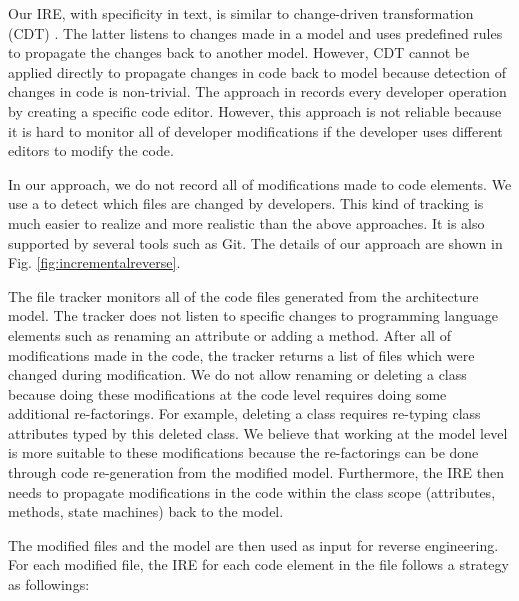 
\noindent
{}
Our IRE, with specificity in text, is similar to change-driven transformation (CDT) \cite{rath2009change}.
The latter listens to changes made in a model and uses predefined rules to propagate the changes back to another model.
However, CDT cannot be applied directly to propagate changes in code back to model because detection of changes in code is non-trivial.
The approach in \cite{kramer2015change} records every developer operation by creating a specific code editor.
However, this approach is not reliable because it is hard to monitor all of developer modifications if the developer uses different editors to modify the code.

In our approach, we do not record all of modifications made to code elements.
We use a  to detect which files are changed by developers.
This kind of tracking is much easier to realize and more realistic than the above approaches. 
It is also supported by several tools such as Git.
The details of our approach are shown in Fig. \ref{fig:incrementalreverse}.

The file tracker monitors all of the code files generated from the architecture model.
The tracker does not listen to specific changes to programming language elements such as renaming an attribute or adding a method.
After all of modifications made in the code, the tracker returns a list of files which were changed during modification.
We do not allow renaming or deleting a class because doing these modifications at the code level requires doing some additional re-factorings.
For example, deleting a class requires re-typing class attributes typed by this deleted class.  
We believe that working at the model level is more suitable to these modifications because the re-factorings can be done through code re-generation from the modified model.
Furthermore, the IRE then needs to propagate modifications in the code within the class scope (attributes, methods, state machines) back to the model. 
 
The modified files and the model are then used as input for reverse engineering.
For each modified file, the IRE for each code element in the file follows a  strategy as followings: 

